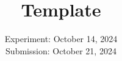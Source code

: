 

\publishers{TU Dortmund – Department of Physics}

\subject{\texorpdfstring{\vspace{2ex}}{}V123\texorpdfstring{\vspace{-2ex}}{}} %
\title{Template} %
\date{
	Experiment: October 14, 2024 %
	\\ Submission: October 21, 2024 %
}




\maketitle
\thispagestyle{empty}

\tableofcontents
\newpage








\printbibliography{}

\newpage



